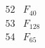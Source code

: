 \documentclass{article}
\begin{document}
{$$\begin{array}{|r|*{7}{r|}}
\\
\hline
52 
 & F_{40} &
 & 
 & 
 & 
 & 
 & 
\\
\hline
53 
 & F_{128} &
 & 
 & 
 & 
 & 
 & 
\\
\hline
54 
 & F_{65} &
 & 
 & 
 & 

\end{array}$$}
\end{document}
